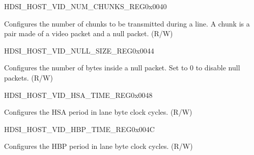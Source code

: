 \begin{register}{H}{DSI\_HOST\_VID\_NUM\_CHUNKS\_REG}{0x0040}\label{regdesc:DSIHOSTVIDNUMCHUNKSREG}
%
%
\regnewline%
\begin{regdesc}\begin{reglist}
\label{fielddesc:DSIHOSTVIDNUMCHUNKS}\item [DSI\_HOST\_VID\_NUM\_CHUNKS] Configures the number of chunks to be transmitted during a line. A chunk is a pair made of a video packet and a null packet. (R/W)
\end{reglist}\end{regdesc}
\end{register}


\begin{register}{H}{DSI\_HOST\_VID\_NULL\_SIZE\_REG}{0x0044}\label{regdesc:DSIHOSTVIDNULLSIZEREG}
%
%
\regnewline%
\begin{regdesc}\begin{reglist}
\label{fielddesc:DSIHOSTVIDNULLSIZE}\item [DSI\_HOST\_VID\_NULL\_SIZE] Configures the number of bytes inside a null packet. Set to 0 to disable null packets. (R/W)
\end{reglist}\end{regdesc}
\end{register}


\begin{register}{H}{DSI\_HOST\_VID\_HSA\_TIME\_REG}{0x0048}\label{regdesc:DSIHOSTVIDHSATIMEREG}
%
%
\regnewline%
\begin{regdesc}\begin{reglist}
\label{fielddesc:DSIHOSTVIDHSATIME}\item [DSI\_HOST\_VID\_HSA\_TIME] Configures the HSA period in lane byte clock cycles. (R/W)
\end{reglist}\end{regdesc}
\end{register}


\begin{register}{H}{DSI\_HOST\_VID\_HBP\_TIME\_REG}{0x004C}\label{regdesc:DSIHOSTVIDHBPTIMEREG}
%
%
\regnewline%
\begin{regdesc}\begin{reglist}
\label{fielddesc:DSIHOSTVIDHBPTIME}\item [DSI\_HOST\_VID\_HBP\_TIME] Configures the HBP period in lane byte clock cycles. (R/W)
\end{reglist}\end{regdesc}
\end{register}


